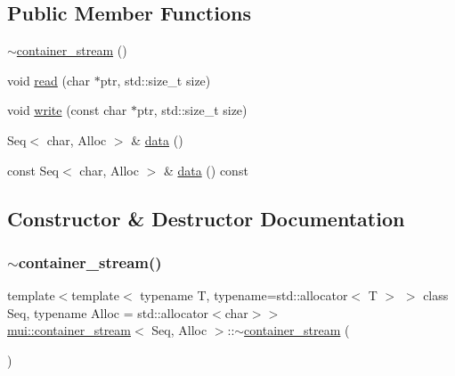 \subsection*{Public Member Functions}
\begin{DoxyCompactItemize}
\item 
\hyperlink{classmui_1_1container__stream_ac544641054e5769092d239a679aec064}{$\sim$container\+\_\+stream} ()
\item 
void \hyperlink{classmui_1_1container__stream_a6bcd220029a12f27de5443a2b48b245a}{read} (char $\ast$ptr, std\+::size\+\_\+t size)
\item 
void \hyperlink{classmui_1_1container__stream_a47bb31cd5e33311702d15e43f87cdc92}{write} (const char $\ast$ptr, std\+::size\+\_\+t size)
\item 
Seq$<$ char, Alloc $>$ \& \hyperlink{classmui_1_1container__stream_a8c71e91aa411bba0cae4b8837961a621}{data} ()
\item 
const Seq$<$ char, Alloc $>$ \& \hyperlink{classmui_1_1container__stream_a205a767916f764fc96055c87186c1229}{data} () const
\end{DoxyCompactItemize}


\subsection{Constructor \& Destructor Documentation}
\mbox{\label{classmui_1_1container__stream_ac544641054e5769092d239a679aec064}} 
\subsubsection{\texorpdfstring{$\sim$container\+\_\+stream()}{~container\_stream()}}
{\footnotesize\ttfamily template$<$template$<$ typename T, typename=std\+::allocator$<$ T $>$ $>$ class Seq, typename Alloc  = std\+::allocator$<$char$>$$>$ \\
\hyperlink{classmui_1_1container__stream}{mui\+::container\+\_\+stream}$<$ Seq, Alloc $>$\+::$\sim$\hyperlink{classmui_1_1container__stream}{container\+\_\+stream} (\begin{DoxyParamCaption}{ }\end{DoxyParamCaption})\hspace{0.3cm}{\ttfamily [inline]}}



